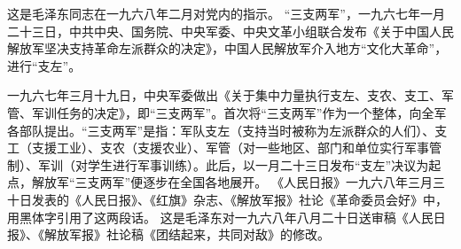 \begin{maonote}
这是毛泽东同志在一九六八年二月对党内的指示。
“三支两军”，一九六七年一月二十三日，中共中央、国务院、中央军委、中央文革小组联合发布《关于中国人民解放军坚决支持革命左派群众的决定》，中国人民解放军介入地方“文化大革命”，进行“支左”。

一九六七年三月十九日，中央军委做出《关于集中力量执行支左、支农、支工、军管、军训任务的决定》，即“三支两军”。首次将“三支两军”作为一个整体，向全军各部队提出。“三支两军”是指：军队支左（支持当时被称为左派群众的人们）、支工（支援工业）、支农（支援农业）、军管（对一些地区、部门和单位实行军事管制）、军训（对学生进行军事训练）。此后，以一月二十三日发布“支左”决议为起点，解放军“三支两军”便逐步在全国各地展开。
《人民日报》一九六八年三月三十日发表的《人民日报》、《红旗》杂志、《解放军报》社论《革命委员会好》中，用黑体字引用了这两段话。
这是毛泽东对一九六八年八月二十日送审稿《人民日报》、《解放军报》社论稿《团结起来，共同对敌》的修改。
\end{maonote}
